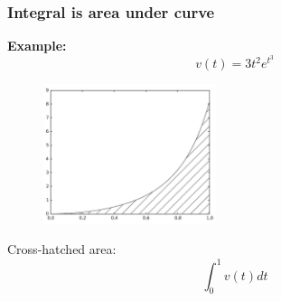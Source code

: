 \documentclass[english,14pt]{beamer}
\begin{document}
\begin{frame}[fragile]

\frametitle{Integral is area under curve}

\vspace*{-2mm}
\textbf{Example:}
\[
v(t) = 3t^2e^{t^3}
\]

\vspace*{-3mm}
\begin{figure}[ht]
	\centering
	\includegraphics[width=0.45\textwidth]{figures/LLp134}
\end{figure}
\vspace*{-4mm}
Cross-hatched area:
\vspace*{-2mm}
\[
	\int_0^1 v(t)dt
\]

	
\end{frame}

\end{document}
